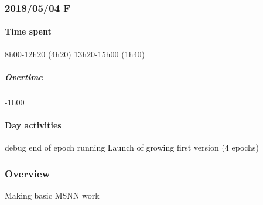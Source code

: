 \subsubsection{2018/05/04 F}
\paragraph{Time spent}
{8h00}-{12h20} (4h20)
{13h20}-{15h00} (1h40) 

\subparagraph{Overtime}
-1h00

\paragraph{Day activities}
debug end of epoch
running 
Launch of growing first version (4 epochs)

\subsubsection{Overview}
Making basic MSNN work